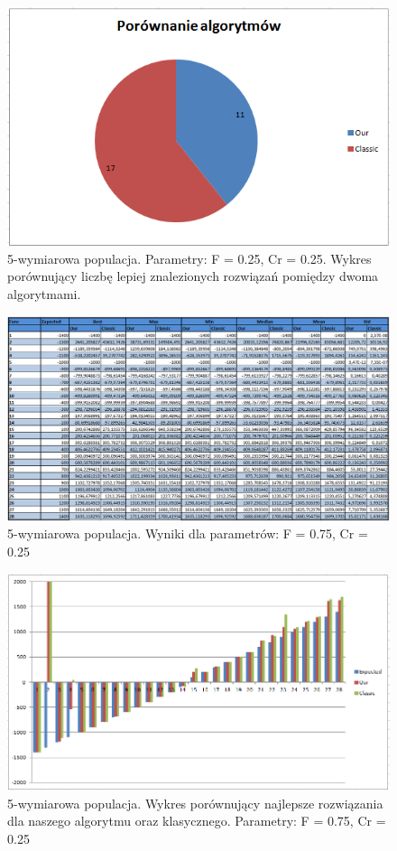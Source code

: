 \documentclass[a4paper]{article}
\begin{document}
\begin{figure}[!h]
\centering
\includegraphics[width=\textwidth]{F5Cr5L5statystyka.png}
\caption{5-wymiarowa populacja. Parametry: F = 0.25, Cr = 0.25. Wykres porównujący liczbę lepiej znalezionych rozwiązań pomiędzy dwoma algorytmami.}
\end{figure}

\begin{figure}[!h]
\centering
\includegraphics[width=\textwidth]{F75Cr25L5tab.png}
\caption{5-wymiarowa populacja. Wyniki dla parametrów: F = 0.75, Cr = 0.25}
\end{figure}

\begin{figure}[!h]
\centering
\includegraphics[width=\textwidth]{F75Cr25L5chart.png}
\caption{5-wymiarowa populacja. Wykres porównujący najlepsze rozwiązania dla naszego algorytmu oraz klasycznego. Parametry: F = 0.75, Cr = 0.25}
\end{figure}
\end{document}
